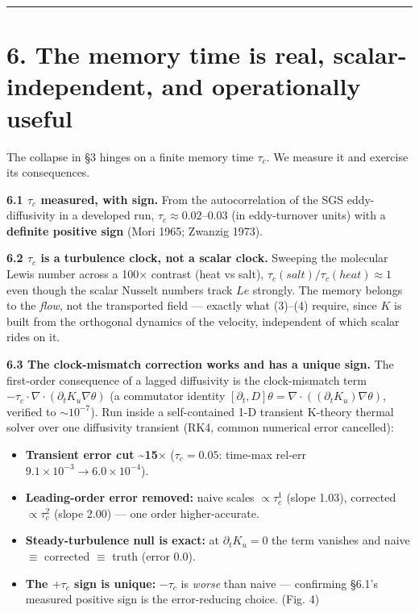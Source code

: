 \documentclass[aps,prfluids,preprint,superscriptaddress,nofootinbib]{revtex4-2}
\begin{document}
\medskip\hrule\medskip


\section*{6. The memory time is real, scalar-independent, and operationally useful}

The collapse in §3 hinges on a finite memory time $\tau _{c}$. We measure it and exercise its consequences.

\textbf{6.1 $\tau _{c}$ measured, with sign.} From the autocorrelation of the SGS eddy-diffusivity in a developed run, $\tau _{c}\approx 0.02\mbox{--}0.03$ (in eddy-turnover units) with a \textbf{definite positive sign} (Mori 1965; Zwanzig 1973).

\textbf{6.2 $\tau _{c}$ is a turbulence clock, not a scalar clock.} Sweeping the molecular Lewis number across a 100\ensuremath{\times} contrast (heat vs salt), $\tau _{c}(salt)/\tau _{c}(heat)\approx 1$ even though the scalar Nusselt numbers track $Le$ strongly. The memory belongs to the \emph{flow}, not the transported field — exactly what (3)–(4) require, since $K$ is built from the orthogonal dynamics of the velocity, independent of which scalar rides on it.

\textbf{6.3 The clock-mismatch correction works and has a unique sign.} The first-order consequence of a lagged diffusivity is the clock-mismatch term $-\tau _{c}\cdot \nabla \cdot (\partial _{t} K_{u} \nabla \theta )$ (a commutator identity $[\partial _{t}, D]\theta  = \nabla \cdot ((\partial _{t} K_{u})\nabla \theta )$, verified to $\sim 10^{-7}$). Run inside a self-contained 1-D transient K-theory thermal solver over one diffusivity transient (RK4, common numerical error cancelled):

\begin{itemize}
\item \textbf{Transient error cut \textasciitilde{}15\ensuremath{\times}} ($\tau _{c}=0.05$: time-max rel-err $9.1\times 10^{-3} \to  6.0\times 10^{-4}$).
\item \textbf{Leading-order error removed:} naive scales $\propto \tau _{c}^{1}$ (slope 1.03), corrected $\propto \tau _{c}^{2}$ (slope 2.00) — one order higher-accurate.
\item \textbf{Steady-turbulence null is exact:} at $\partial _{t} K_{u}=0$ the term vanishes and naive \ensuremath{\equiv} corrected \ensuremath{\equiv} truth (error 0.0).
\item \textbf{The $+\tau _{c}$ sign is unique:} $-\tau _{c}$ is \emph{worse} than naive — confirming §6.1's measured positive sign is the error-reducing choice. (Fig. 4)
\end{itemize}
\end{document}
